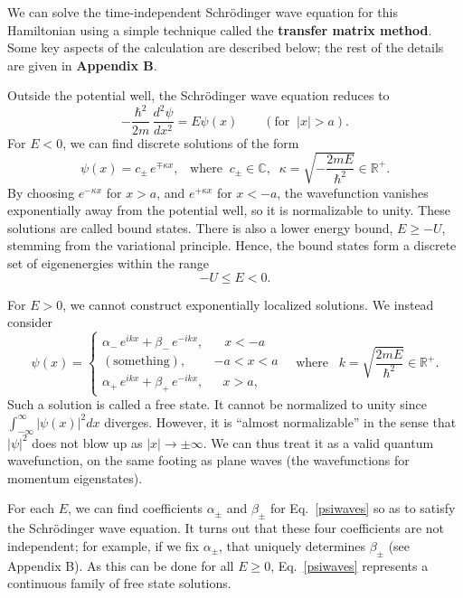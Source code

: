 \documentclass[pra,12pt]{revtex4-2}
\begin{document}
We can solve the time-independent Schr\"odinger wave equation for this
Hamiltonian using a simple technique called the \textbf{transfer
  matrix method}.  Some key aspects of the calculation are described
below; the rest of the details are given in \textbf{Appendix B}.

Outside the potential well, the Schr\"odinger wave equation reduces to
\begin{equation}
  -\frac{\hbar^2}{2m}\,\frac{d^2\psi}{dx^2} = E \psi(x)
  \qquad (\text{for}\;\;|x| > a).  
  \label{eq:psioutside}
\end{equation}
For $E < 0$, we can find discrete solutions of the form
\begin{equation}
  \psi(x) = c_\pm\, e^{\mp\kappa x},\;\;\;\mathrm{where}\;\;
  c_\pm \in \mathbb{C}, \;\;
  \kappa = \sqrt{-\frac{2mE}{\hbar^2}} \in \mathbb{R}^+.
\end{equation}
By choosing $e^{-\kappa x}$ for $x > a$, and $e^{+\kappa x}$ for $x <
-a$, the wavefunction vanishes exponentially away from the potential
well, so it is normalizable to unity.  These solutions are called
bound states.  There is also a lower energy bound, $E \ge -U$,
stemming from the variational principle.  Hence, the bound states form
a discrete set of eigenenergies within the range
\begin{equation}
  -U \le E < 0.
\end{equation}

For $E > 0$, we cannot construct exponentially localized solutions.
We instead consider
\begin{equation}
  \psi(x) = \begin{cases} \alpha_-\, e^{ik x} + \beta_-\, e^{-ik x}, & \;\;\;x < -a\\ (\mathrm{something}) , & -a < x < a\\ \alpha_+\, e^{ik x} + \beta_+\, e^{-ik x} , & \;\;\,x > a,\end{cases}
  \quad\mathrm{where}\;\;\;
  k = \sqrt{\frac{2mE}{\hbar^2}} \in \mathbb{R}^+.
  \label{psiwaves}
\end{equation}
Such a solution is called a free state.  It cannot be normalized to
unity since $\int_{-\infty}^\infty |\psi(x)|^2 dx$ diverges.  However,
it is ``almost normalizable'' in the sense that $|\psi|^2$ does not
blow up as $|x| \rightarrow \pm\infty$.  We can thus treat it as a
valid quantum wavefunction, on the same footing as plane waves (the
wavefunctions for momentum eigenstates).

For each $E$, we can find coefficients $\alpha_\pm$ and $\beta_\pm$
for Eq.~\eqref{psiwaves} so as to satisfy the Schr\"odinger wave
equation.  It turns out that these four coefficients are not
independent; for example, if we fix $\alpha_\pm$, that uniquely
determines $\beta_\pm$ (see Appendix B).  As this can be done for all
$E \ge 0$, Eq.~\eqref{psiwaves} represents a continuous family of free
state solutions.
\end{document}

